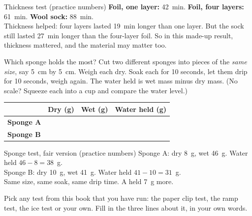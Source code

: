 \begin{worked}{Thickness test (practice numbers)}
\textbf{Foil, one layer:} 42~min. \textbf{Foil, four layers:} 61~min. \textbf{Wool sock:} 88~min.\\
Thickness helped: four layers lasted 19~min longer than one layer. But the sock still lasted 27~min longer than the four-layer foil. So in this made-up result, thickness mattered, and the material may matter too.
\end{worked}

\begin{center}
\end{center}

\begin{tryit}{Which sponge holds the most?}
Cut two different sponges into pieces of the \emph{same size}, say 5~cm by 5~cm. Weigh each dry. Soak each for 10 seconds, let them drip for 10 seconds, weigh again. The water held is wet mass minus dry mass. (No scale? Squeeze each into a cup and compare the water level.)\par\medskip
\renewcommand{\arraystretch}{1.6}
\begin{tabular}{|l|c|c|c|}
\hline
 & \textbf{Dry (g)} & \textbf{Wet (g)} & \textbf{Water held (g)}\\ \hline
\textbf{Sponge A} & & & \\ \hline
\textbf{Sponge B} & & & \\ \hline
\end{tabular}
\end{tryit}

\begin{worked}{Sponge test, fair version (practice numbers)}
Sponge A: dry 8~g, wet 46~g. Water held $46-8=38$~g.\\
Sponge B: dry 10~g, wet 41~g. Water held $41-10=31$~g.\\
Same size, same soak, same drip time. A held 7~g more.
\end{worked}
\clearpage
\thispagestyle{fancy}
Pick any test from this book that you have run: the paper clip test, the ramp test, the ice test or your own. Fill in the three lines about it, in your own words.

